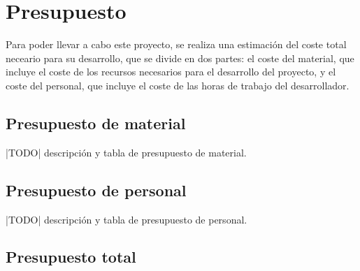 \newpage{}
\section{Presupuesto}\label{sec:presupuesto}
Para poder llevar a cabo este proyecto, se realiza una estimación del coste
total neceario para su desarrollo, que se divide en dos partes: el coste del
material, que incluye el coste de los recursos necesarios para el desarrollo del
proyecto, y el coste del personal, que incluye el coste de las horas de trabajo
del desarrollador.

\subsection{Presupuesto de material}\label{subsec:pres_material}
|TODO| descripción y tabla de presupuesto de material.

\subsection{Presupuesto de personal}\label{subsec:pres_personal}
|TODO| descripción y tabla de presupuesto de personal.

\subsection{Presupuesto total}\label{subsec:pres_total}
